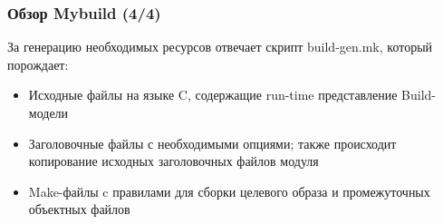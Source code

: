 \documentclass{beamer}
\begin{document}
\begin{frame}
	\frametitle{Обзор Mybuild (4/4)}
	За генерацию необходимых ресурсов отвечает скрипт build-gen.mk, который порождает:
	\begin{itemize}
		\item Исходные файлы на языке C, содержащие run-time представление Build-модели
		\item Заголовочные файлы с необходимыми опциями; также происходит копирование исходных заголовочных файлов модуля
		\item Make-файлы c правилами для сборки целевого образа и промежуточных объектных файлов
	\end{itemize}
\end{frame}



\end{document}
